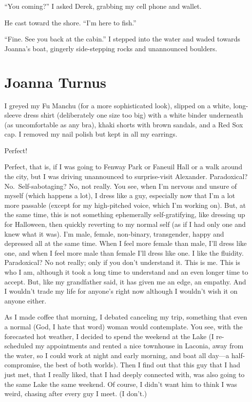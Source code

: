 ``You coming?'' I asked Derek, grabbing my cell phone and wallet.

He cast toward the shore. ``I'm here to fish.''

``Fine. See you back at the cabin.'' I stepped into the water and waded
towards Joanna's boat, gingerly side-stepping rocks and unannounced
boulders.

\chapter{Joanna Turnus}

\titlemark

I greyed my Fu Manchu (for a more sophisticated look), slipped on a
white, long-sleeve dress shirt (deliberately one size too big) with a
white binder underneath (as uncomfortable as any bra), khaki shorts with
brown sandals, and a Red Sox cap. I removed my nail polish but kept in
all my earrings.

Perfect!

Perfect, that is, if I was going to Fenway Park or Faneuil Hall or a
walk around the city, but I was driving unannounced to surprise-visit
Alexander. Paradoxical? No.~Self-sabotaging? No, not really. You see,
when I'm nervous and unsure of myself (which happens a lot), I dress
like a guy, especially now that I'm a lot more passable (except for my
high-pitched voice, which I'm working on). But, at the same time, this
is not something ephemerally self-gratifying, like dressing up for
Halloween, then quickly reverting to my normal self (as if I had only
one and knew what it was). I'm male, female, non-binary, transgender,
happy and depressed all at the same time. When I feel more female than
male, I'll dress like one, and when I feel more male than female I'll
dress like one. I like the fluidity. Paradoxical? No not really; only if
you don't understand it. This is me. This is who I am, although it took
a long time to understand and an even longer time to accept. But, like
my grandfather said, it has given me an edge, an empathy. And I wouldn't
trade my life for anyone's right now although I wouldn't wish it on
anyone either.

As I made coffee that morning, I debated canceling my trip, something
that even a normal (God, I hate that word) woman would contemplate. You
see, with the forecasted hot weather, I decided to spend the weekend at
the Lake (I re-scheduled my appointments and rented a nice townhouse in
Laconia, away from the water, so I could work at night and early
morning, and boat all day---a half-compromise, the best of both worlds).
Then I find out that this guy that I had just met, that I really liked,
that I had deeply connected with, was also going to the same Lake the
same weekend. Of course, I didn't want him to think I was weird, chasing
after every guy I meet. (I don't.)

